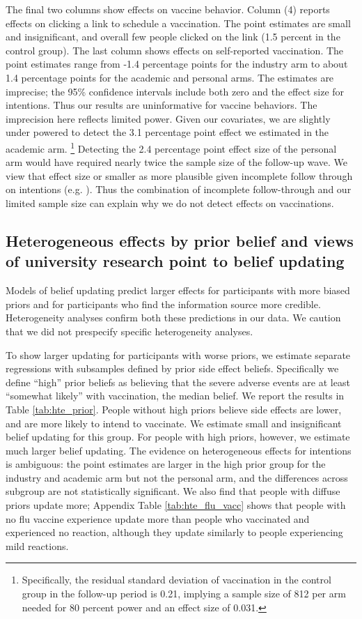 The final two columns show effects on vaccine behavior. Column (4) reports effects on clicking 
a link to schedule a vaccination. The point estimates are small and insignificant, and overall 
few people clicked on the link (1.5 percent in the control group). 
The last column shows effects on self-reported vaccination. 
The point estimates range from -1.4 percentage points for the industry arm to about 
1.4 percentage points for the academic and personal arms. The estimates are imprecise; the 95\% confidence intervals include both zero and the effect size for intentions. 
Thus our results are uninformative for vaccine behaviors.  
The imprecision here reflects limited power. Given our covariates, we are slightly under powered to detect the 3.1 percentage point effect we estimated in the academic arm.%
\footnote{Specifically, the residual standard deviation of vaccination in the control group in the follow-up period is 0.21, implying a sample size of 812 per arm needed for 80 percent power and an effect size of 0.031.}
Detecting the 2.4 percentage point effect size of the personal arm would have required nearly twice the sample size of the follow-up wave. We view that effect size or smaller as more plausible given incomplete follow through on intentions (e.g. \citet{bronchetti2015attention}). Thus the combination of incomplete follow-through and our limited sample size can explain why we do not detect effects on vaccinations.

\subsection{Heterogeneous effects by prior belief and views of university research point to 
belief updating}

Models of belief updating predict larger effects for participants with more biased priors
and for participants who find the information source more credible. Heterogeneity analyses 
confirm both these predictions in our data. We caution that we did not 
prespecify specific heterogeneity analyses. 

To show larger updating for participants with worse priors, we estimate separate regressions
with subsamples defined by prior side effect beliefs.  Specifically we define 
“high” prior beliefs as believing that the severe adverse events are at least “somewhat 
likely” with vaccination, the median belief. We report the results in Table
\ref{tab:hte_prior}. People without high priors believe side 
effects are lower, and are more likely to intend to vaccinate. We estimate small and 
insignificant  belief updating for this group. For people with high priors, however, we 
estimate much  larger belief updating. The evidence on heterogeneous effects for intentions 
is ambiguous: the point estimates are larger in the high prior group for the industry and 
academic arm but not the personal arm, and the differences across subgroup are not 
statistically significant. 
We also find that people with diffuse priors update more; Appendix Table
\ref{tab:hte_flu_vacc} shows that people with no flu vaccine experience update more than 
people who vaccinated and experienced no reaction, although they update similarly to people 
experiencing mild reactions.

